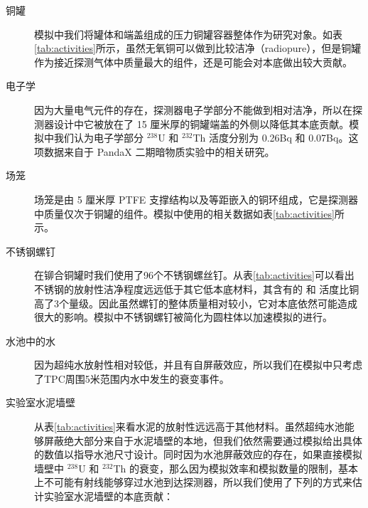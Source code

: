\begin{description}

    \item[铜罐] 模拟中我们将罐体和端盖组成的压力铜罐容器整体作为研究对象。如表\ref{tab:activities}所示，虽然无氧铜可以做到比较洁净（radiopure），但是铜罐作为接近探测气体中质量最大的组件，还是可能会对本底做出较大贡献。

    \item[电子学] 因为大量电气元件的存在，探测器电子学部分不能做到相对洁净，所以在探测器设计中它被放在了 15 厘米厚的铜罐端盖的外侧以降低其本底贡献。模拟中我们认为电子学部分 $^{238}$U 和 $^{232}$Th 活度分别为 0.26Bq 和 0.07Bq。这项数据来自于 PandaX 二期暗物质实验中的相关研究。
    
    \item[场笼] 场笼是由 5 厘米厚 PTFE 支撑结构以及等距嵌入的铜环组成，它是探测器中质量仅次于铜罐的组件。模拟中使用的相关数据如表\ref{tab:activities}所示。

    \item[不锈钢螺钉] 在铆合铜罐时我们使用了96个不锈钢螺丝钉。从表\ref{tab:activities}可以看出不锈钢的放射性洁净程度远远低于其它低本底材料，其含有的 \utte 和 \thttt 活度比铜高了3个量级。因此虽然螺钉的整体质量相对较小，它对本底依然可能造成很大的影响。模拟中不锈钢螺钉被简化为圆柱体以加速模拟的进行。

    \item[水池中的水] 因为超纯水放射性相对较低，并且有自屏蔽效应，所以我们在模拟中只考虑了TPC周围5米范围内水中发生的衰变事件。

    \item[实验室水泥墙壁] 从表\ref{tab:activities}来看水泥的放射性远远高于其他材料。虽然超纯水池能够屏蔽绝大部分来自于水泥墙壁的本地，但我们依然需要通过模拟给出具体的数值以指导水池尺寸设计。同时因为水池屏蔽效应的存在，如果直接模拟墙壁中 $^{238}$U 和 $^{232}$Th 的衰变，那么因为模拟效率和模拟数量的限制，基本上不可能有射线能够穿过水池到达探测器，所以我们使用了下列的方式来估计实验室水泥墙壁的本底贡献：


\end{description}
